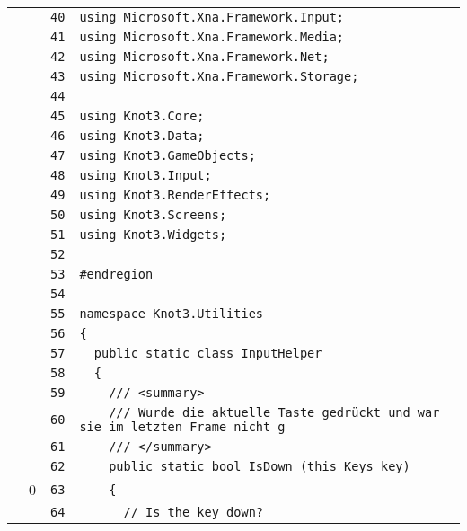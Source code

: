 \documentclass[a4paper,10pt]{article}
\begin{document}
\begin{longtable}[l]{lrrl}
\cellcolor{gray} &  & \verb~40~ & \verb~using Microsoft.Xna.Framework.Input;~\\
\cellcolor{gray} &  & \verb~41~ & \verb~using Microsoft.Xna.Framework.Media;~\\
\cellcolor{gray} &  & \verb~42~ & \verb~using Microsoft.Xna.Framework.Net;~\\
\cellcolor{gray} &  & \verb~43~ & \verb~using Microsoft.Xna.Framework.Storage;~\\
\cellcolor{gray} &  & \verb~44~ & \verb~~\\
\cellcolor{gray} &  & \verb~45~ & \verb~using Knot3.Core;~\\
\cellcolor{gray} &  & \verb~46~ & \verb~using Knot3.Data;~\\
\cellcolor{gray} &  & \verb~47~ & \verb~using Knot3.GameObjects;~\\
\cellcolor{gray} &  & \verb~48~ & \verb~using Knot3.Input;~\\
\cellcolor{gray} &  & \verb~49~ & \verb~using Knot3.RenderEffects;~\\
\cellcolor{gray} &  & \verb~50~ & \verb~using Knot3.Screens;~\\
\cellcolor{gray} &  & \verb~51~ & \verb~using Knot3.Widgets;~\\
\cellcolor{gray} &  & \verb~52~ & \verb~~\\
\cellcolor{gray} &  & \verb~53~ & \verb~#endregion~\\
\cellcolor{gray} &  & \verb~54~ & \verb~~\\
\cellcolor{gray} &  & \verb~55~ & \verb~namespace Knot3.Utilities~\\
\cellcolor{gray} &  & \verb~56~ & \verb~{~\\
\cellcolor{gray} &  & \verb~57~ & \verb~  public static class InputHelper~\\
\cellcolor{gray} &  & \verb~58~ & \verb~  {~\\
\cellcolor{gray} &  & \verb~59~ & \verb~    /// <summary>~\\
\cellcolor{gray} &  & \verb~60~ & \verb~    /// Wurde die aktuelle Taste gedrückt und war sie im letzten Frame nicht g~\\
\cellcolor{gray} &  & \verb~61~ & \verb~    /// </summary>~\\
\cellcolor{gray} &  & \verb~62~ & \verb~    public static bool IsDown (this Keys key)~\\
\cellcolor{red} & 0 & \verb~63~ & \verb~    {~\\
\cellcolor{gray} &  & \verb~64~ & \verb~      // Is the key down?~\\

\end{longtable}
\end{document}
